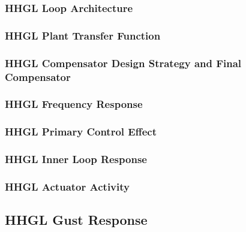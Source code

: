 \subsubsection{HHGL Loop Architecture}

\subsubsection{HHGL Plant Transfer Function}

\subsubsection{HHGL Compensator Design Strategy and Final Compensator}

\subsubsection{HHGL Frequency Response}

\subsubsection{HHGL Primary Control Effect}

\subsubsection{HHGL Inner Loop Response}

\subsubsection{HHGL Actuator Activity}

\subsection{HHGL Gust Response}

